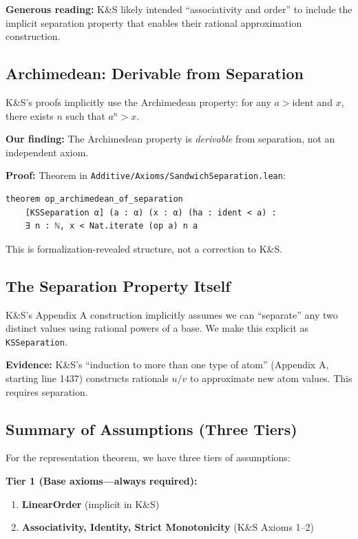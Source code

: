 \documentclass[11pt]{article}
\theoremstyle{definition}
\theoremstyle{remark}
\begin{document}
\textbf{Generous reading:} K\&S likely intended ``associativity and order'' to include the implicit separation property that enables their rational approximation construction.

\subsection{Archimedean: Derivable from Separation}

K\&S's proofs implicitly use the Archimedean property: for any $a > \text{ident}$ and $x$, there exists $n$ such that $a^n > x$.

\textbf{Our finding:} The Archimedean property is \emph{derivable} from separation, not an independent axiom.

\textbf{Proof:} Theorem in \texttt{Additive/Axioms/SandwichSeparation.lean}:
\begin{lstlisting}
theorem op_archimedean_of_separation
    [KSSeparation α] (a : α) (x : α) (ha : ident < a) :
    ∃ n : ℕ, x < Nat.iterate (op a) n a
\end{lstlisting}

This is formalization-revealed structure, not a correction to K\&S.

\subsection{The Separation Property Itself}

K\&S's Appendix A construction implicitly assumes we can ``separate'' any two distinct values using rational powers of a base.
We make this explicit as \texttt{KSSeparation}.

\textbf{Evidence:} K\&S's ``induction to more than one type of atom'' (Appendix A, starting line 1437) constructs rationals $u/v$ to approximate new atom values.
This requires separation.

\subsection{Summary of Assumptions (Three Tiers)}

For the representation theorem, we have three tiers of assumptions:

\textbf{Tier 1 (Base axioms---always required):}
\begin{enumerate}
\item \textbf{LinearOrder} (implicit in K\&S)
\item \textbf{Associativity, Identity, Strict Monotonicity} (K\&S Axioms 1--2)
\end{enumerate}
\end{document}
